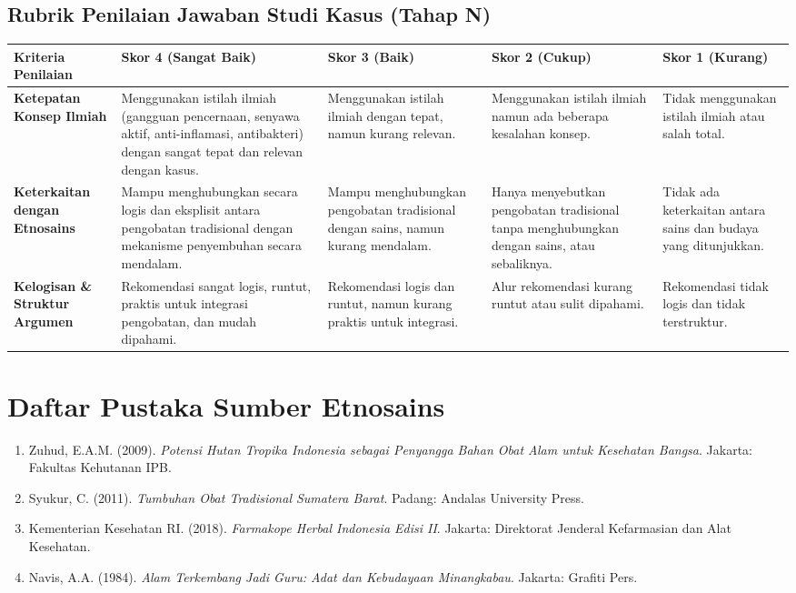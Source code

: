 \documentclass[a4paper,12pt]{article}
\begin{document}
\subsection{Rubrik Penilaian Jawaban Studi Kasus (Tahap N)}

\begin{longtable}{|p{3cm}|p{3cm}|p{3cm}|p{3cm}|p{3cm}|}
\hline
\textbf{Kriteria Penilaian} & \textbf{Skor 4 (Sangat Baik)} & \textbf{Skor 3 (Baik)} & \textbf{Skor 2 (Cukup)} & \textbf{Skor 1 (Kurang)} \\
\hline
\textbf{Ketepatan Konsep Ilmiah} & Menggunakan istilah ilmiah (gangguan pencernaan, senyawa aktif, anti-inflamasi, antibakteri) dengan sangat tepat dan relevan dengan kasus. & Menggunakan istilah ilmiah dengan tepat, namun kurang relevan. & Menggunakan istilah ilmiah namun ada beberapa kesalahan konsep. & Tidak menggunakan istilah ilmiah atau salah total. \\
\hline
\textbf{Keterkaitan dengan Etnosains} & Mampu menghubungkan secara logis dan eksplisit antara pengobatan tradisional dengan mekanisme penyembuhan secara mendalam. & Mampu menghubungkan pengobatan tradisional dengan sains, namun kurang mendalam. & Hanya menyebutkan pengobatan tradisional tanpa menghubungkan dengan sains, atau sebaliknya. & Tidak ada keterkaitan antara sains dan budaya yang ditunjukkan. \\
\hline
\textbf{Kelogisan \& Struktur Argumen} & Rekomendasi sangat logis, runtut, praktis untuk integrasi pengobatan, dan mudah dipahami. & Rekomendasi logis dan runtut, namun kurang praktis untuk integrasi. & Alur rekomendasi kurang runtut atau sulit dipahami. & Rekomendasi tidak logis dan tidak terstruktur. \\
\hline
\end{longtable}

\section{Daftar Pustaka Sumber Etnosains}

\begin{enumerate}
\item Zuhud, E.A.M. (2009). \textit{Potensi Hutan Tropika Indonesia sebagai Penyangga Bahan Obat Alam untuk Kesehatan Bangsa}. Jakarta: Fakultas Kehutanan IPB.
\item Syukur, C. (2011). \textit{Tumbuhan Obat Tradisional Sumatera Barat}. Padang: Andalas University Press.
\item Kementerian Kesehatan RI. (2018). \textit{Farmakope Herbal Indonesia Edisi II}. Jakarta: Direktorat Jenderal Kefarmasian dan Alat Kesehatan.
\item Navis, A.A. (1984). \textit{Alam Terkembang Jadi Guru: Adat dan Kebudayaan Minangkabau}. Jakarta: Grafiti Pers.
\end{enumerate}
\end{document}
